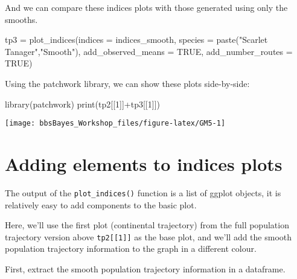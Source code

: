\documentclass[
]{book}
\newenvironment{Shaded}{\begin{snugshade}}{\end{snugshade}}
\newcommand{\AttributeTok}[1]{\textcolor[rgb]{0.77,0.63,0.00}{#1}}
\newcommand{\ConstantTok}[1]{\textcolor[rgb]{0.00,0.00,0.00}{#1}}
\newcommand{\DecValTok}[1]{\textcolor[rgb]{0.00,0.00,0.81}{#1}}
\newcommand{\FunctionTok}[1]{\textcolor[rgb]{0.00,0.00,0.00}{#1}}
\newcommand{\NormalTok}[1]{#1}
\newcommand{\OtherTok}[1]{\textcolor[rgb]{0.56,0.35,0.01}{#1}}
\newcommand{\SpecialCharTok}[1]{\textcolor[rgb]{0.00,0.00,0.00}{#1}}
\newcommand{\StringTok}[1]{\textcolor[rgb]{0.31,0.60,0.02}{#1}}
\begin{document}
And we can compare these indices plots with those generated using only the smooths.

\begin{Shaded}
\begin{Highlighting}[]
\NormalTok{tp3 }\OtherTok{=} \FunctionTok{plot\_indices}\NormalTok{(}\AttributeTok{indices =}\NormalTok{ indices\_smooth,}
                         \AttributeTok{species =} \FunctionTok{paste}\NormalTok{(}\StringTok{"Scarlet Tanager"}\NormalTok{,}\StringTok{"Smooth"}\NormalTok{),}
                  \AttributeTok{add\_observed\_means =} \ConstantTok{TRUE}\NormalTok{,}
                  \AttributeTok{add\_number\_routes =} \ConstantTok{TRUE}\NormalTok{)}
\end{Highlighting}
\end{Shaded}

Using the patchwork library, we can show these plots side-by-side:

\begin{Shaded}
\begin{Highlighting}[]
\FunctionTok{library}\NormalTok{(patchwork)}
\FunctionTok{print}\NormalTok{(tp2[[}\DecValTok{1}\NormalTok{]]}\SpecialCharTok{+}\NormalTok{tp3[[}\DecValTok{1}\NormalTok{]])}
\end{Highlighting}
\end{Shaded}

\begin{center}\texttt{[image: bbsBayes\_Workshop\_files/figure-latex/GM5-1]} \end{center}

\hypertarget{adding-elements-to-indices-plots}{%
\section{Adding elements to indices plots}\label{adding-elements-to-indices-plots}}

The output of the \texttt{plot\_indices()} function is a list of ggplot objects, it is relatively easy to add components to the basic plot.

Here, we'll use the first plot (continental trajectory) from the full population trajectory version above \texttt{tp2{[}{[}1{]}{]}} as the base plot, and we'll add the smooth population trajectory information to the graph in a different colour.

First, extract the smooth population trajectory information in a dataframe.

\begin{Shaded}
\end{Shaded}
\end{document}
